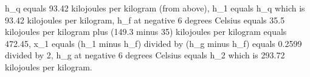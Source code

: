 h_q equals 93.42 kilojoules per kilogram (from above),
h_1 equals h_q which is 93.42 kilojoules per kilogram,
h_f at negative 6 degrees Celsius equals 35.5 kilojoules per kilogram plus (149.3 minus 35) kilojoules per kilogram equals 472.45,
x_1 equals (h_1 minus h_f) divided by (h_g minus h_f) equals 0.2599 divided by 2,
h_g at negative 6 degrees Celsius equals h_2 which is 293.72 kilojoules per kilogram.